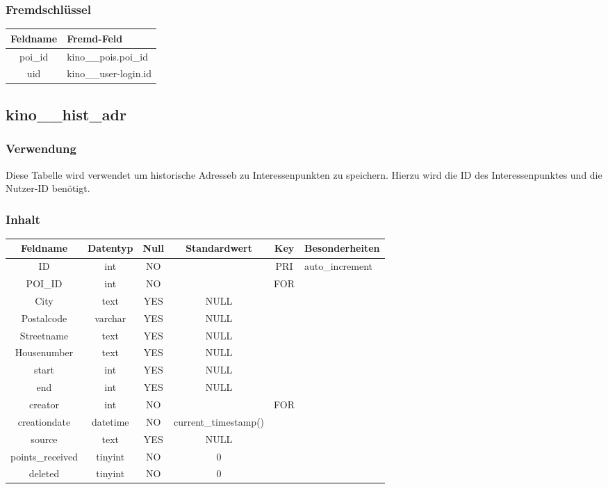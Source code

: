 \subsubsection{Fremdschlüssel}
\begin{table}[H]
	\begin{tabular}{|c|p{12.5cm}|}
		\hline
		\textbf{Feldname} & \textbf{Fremd-Feld} \\ \hline
		poi\_id & kino\_\_pois.poi\_id \\ \hline
		uid & kino\_\_user-login.id \\ \hline
	\end{tabular}
\end{table}
\subsection{kino\_\_hist\_adr}
\subsubsection{Verwendung} Diese Tabelle wird verwendet um historische Adresseb zu Interessenpunkten zu speichern. Hierzu wird die ID des Interessenpunktes und die Nutzer-ID benötigt.
\subsubsection{Inhalt}
\begin{table}[H]
	\begin{tabular}{|c|c|c|c|c|p{3.5cm}|}
		\hline
		\textbf{Feldname} & \textbf{Datentyp} & \textbf{Null} & \textbf{Standardwert} & \textbf{Key}   & \textbf{Besonderheiten} \\ \hline
		ID & int & NO &  & PRI & auto\_increment \\ \hline
		POI\_ID & int & NO &  & FOR & \\ \hline
		City & text & YES & NULL &  & \\ \hline
		Postalcode & varchar & YES & NULL &  & \\ \hline
		Streetname & text & YES & NULL &  & \\ \hline
		Housenumber & text & YES & NULL &  & \\ \hline
		start & int & YES & NULL &  & \\ \hline
		end & int & YES & NULL &  & \\ \hline
		creator & int & NO &  & FOR & \\ \hline
		creationdate & datetime & NO & current\_timestamp() &  & \\ \hline
		source & text & YES & NULL &  & \\ \hline
		points\_received & tinyint & NO & 0 &  & \\ \hline
		deleted & tinyint & NO & 0 &  & \\ \hline
	\end{tabular}
\end{table}
